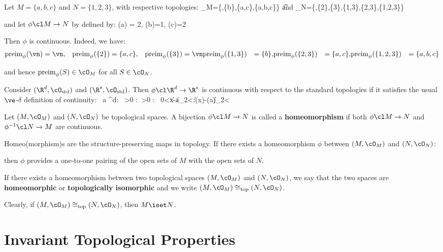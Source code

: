 \be
Let $M = \{a,b,c\}$ and $N=\{1,2,3\}$, with respective topologies:
\bse
\cO_M=\{\vn,\{b\},\{a,c\},\{a,b,c\}\} \quad \t{and} \quad \cO_N=\{\vn,\{2\},\{3\},\{1,3\},\{2,3\},\{1,2,3\}\}
\ese

and let $\phi\cl M \to N$ by defined by:
\bse
\phi(a) = 2, \quad \phi(b)=1, \quad \phi(c)=2
\ese

Then $\phi$ is continuous. Indeed, we have:
\begin{align*}
\mathrm{preim}_\phi(\vn)
&= \vn, & \mathrm{preim}_\phi(\{2\}) &= \{a,c\}, & \mathrm{preim}_\phi(\{3\}) &= \vn\mathrm{preim}_\phi(\{1,3\})
&= \{b\}, & \mathrm{preim}_\phi(\{2,3\})
&=\{a,c\}, & \mathrm{preim}_\phi(\{1,2,3\})
&= \{a,b,c\}
\end{align*}

and hence $\mathrm{preim}_\phi(S) \in \cO_M$ for all $S \in \cO_N$.
\ee

\be
Consider $(\R^d,\cO_\mathrm{std})$ and $(\R^s,\cO_\mathrm{std})$. Then $\phi \cl \R^d\to\R^s$ is continuous with
respect to the standard topologies if it satisfies the usual $\ve$-$\delta$ definition of continuity:
\bse
\forall \, a \in \R^d: \forall \, \ve >0 :\exists \, \delta >0 : \forall \, 0<\|x-a\|_2<\delta:\|\phi(x)-\phi(a)\|_2<\ve
\ese
\ee

\bd [Homeomorphism]
Let $(M,\cO_M)$ and $(N,\cO_N)$ be topological spaces. A bijection $\phi\cl M\to N$ is called a
\textbf{homeomorphism} if both $\phi\cl M\to N$ and $\phi^{-1}\cl N\to M$ are continuous.
\ed

Homeo(morphism)s are the structure-preserving maps in topology. If there exists a homeomorphism $\phi$ between $(M,
\cO_M)$ and $(N,\cO_N)$:

\bse
{}
\ese

then $\phi$ provides a one-to-one pairing of the open sets of $M$ with the open sets of $N$.

If there exists a homeomorphism between two topological spaces $(M,\cO_M)$ and $(N,\cO_N)$, we say that the two
spaces are \textbf{homeomorphic} or \textbf{topologically isomorphic} and we write $(M,\cO_M) \cong_\mathrm{top} (N,
\cO_N)$.
\ed

Clearly, if $(M,\cO_M) \cong_\mathrm{top} (N,\cO_N)$, then $M \iset N$.

\section{Invariant Topological Properties}

